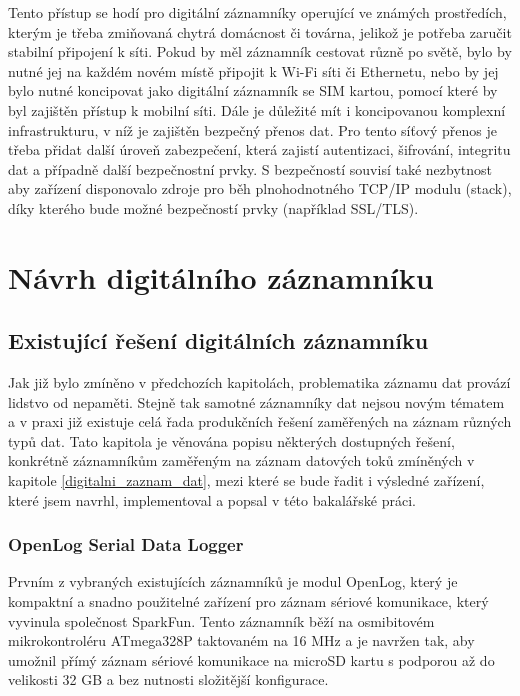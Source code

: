 Tento přístup se hodí pro digitální záznamníky operující ve známých prostředích, kterým je třeba zmiňovaná chytrá domácnost či továrna, jelikož je potřeba zaručit stabilní připojení k síti. Pokud by měl záznamník cestovat různě po světě, bylo by nutné jej na každém novém místě připojit k Wi-Fi síti či Ethernetu, nebo by jej bylo nutné koncipovat jako digitální záznamník se SIM kartou, pomocí které by byl zajištěn přístup k mobilní síti. Dále je důležité mít i koncipovanou komplexní infrastrukturu, v níž je zajištěn bezpečný přenos dat. Pro tento síťový přenos je třeba přidat další úroveň zabezpečení, která zajistí autentizaci, šifrování, integritu dat a případně další bezpečnostní prvky. S bezpečností souvisí také nezbytnost aby zařízení disponovalo zdroje pro běh plnohodnotného TCP/IP modulu
(stack), díky kterého bude možné bezpečností prvky (například SSL/TLS).


\chapter{Návrh digitálního záznamníku}


\section{Existující řešení digitálních záznamníku}
Jak již bylo zmíněno v předchozích kapitolách, problematika záznamu dat provází lidstvo od nepaměti. Stejně tak samotné záznamníky dat nejsou novým tématem a v praxi již existuje celá řada produkčních řešení zaměřených na záznam různých typů dat. Tato kapitola je věnována popisu některých dostupných řešení, konkrétně záznamníkům zaměřeným na záznam datových toků zmíněných v kapitole \ref{digitalni_zaznam_dat}, mezi které se bude řadit i výsledné zařízení, které jsem navrhl, implementoval a popsal v této bakalářské práci. 


\subsection{OpenLog Serial Data Logger}
\label{openlog_serial_datalogger_module}
Prvním z vybraných existujících záznamníků je modul OpenLog, který je kompaktní a snadno použitelné zařízení pro záznam sériové komunikace, který vyvinula společnost SparkFun. Tento záznamník běží na osmibitovém mikrokontroléru ATmega328P taktovaném na 16 MHz a je navržen tak, aby umožnil přímý záznam sériové komunikace na microSD kartu s podporou až do velikosti 32 GB a bez nutnosti složitější konfigurace. \cite{sparkfun_openlog_tutorial}

